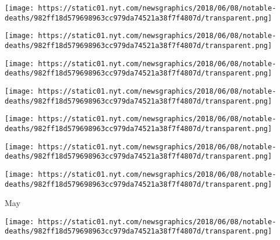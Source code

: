 \href{https://www.nytimes.com/2018/06/05/obituaries/dwight-clark-61-dies-made-a-touchdown-catch-for-the-ages.html}{}

\texttt{[image: https://static01.nyt.com/newsgraphics/2018/06/08/notable-deaths/982ff18d579698963cc979da74521a38f7f4807d/transparent.png]}

\href{https://www.nytimes.com/2018/06/05/obituaries/eddy-clearwater-chicago-bluesman-is-dead-at-83.html}{}

\texttt{[image: https://static01.nyt.com/newsgraphics/2018/06/08/notable-deaths/982ff18d579698963cc979da74521a38f7f4807d/transparent.png]}

\href{https://www.nytimes.com/2018/06/05/fashion/kate-spade-dead.html}{}

\texttt{[image: https://static01.nyt.com/newsgraphics/2018/06/08/notable-deaths/982ff18d579698963cc979da74521a38f7f4807d/transparent.png]}

\href{https://www.nytimes.com/2018/06/04/obituaries/frank-carlucci-dead.html}{}

\texttt{[image: https://static01.nyt.com/newsgraphics/2018/06/08/notable-deaths/982ff18d579698963cc979da74521a38f7f4807d/transparent.png]}

\href{https://www.nytimes.com/2018/06/04/obituaries/jill-ker-conway-83-feminist-author-and-smith-president-dies.html}{}

\texttt{[image: https://static01.nyt.com/newsgraphics/2018/06/08/notable-deaths/982ff18d579698963cc979da74521a38f7f4807d/transparent.png]}

\href{https://www.nytimes.com/2018/06/01/obituaries/ella-brennan-grande-dame-restaurateur-of-new-orleans-dies-at-92.html}{}

\texttt{[image: https://static01.nyt.com/newsgraphics/2018/06/08/notable-deaths/982ff18d579698963cc979da74521a38f7f4807d/transparent.png]}

\href{https://www.nytimes.com/2018/06/01/obituaries/skou-nobel-chemistry-obituary.html}{}

\texttt{[image: https://static01.nyt.com/newsgraphics/2018/06/08/notable-deaths/982ff18d579698963cc979da74521a38f7f4807d/transparent.png]}

May

\href{https://www.nytimes.com/2018/05/31/obituaries/ted-dabney-dead-atari-pong.html}{}

\texttt{[image: https://static01.nyt.com/newsgraphics/2018/06/08/notable-deaths/982ff18d579698963cc979da74521a38f7f4807d/transparent.png]}


